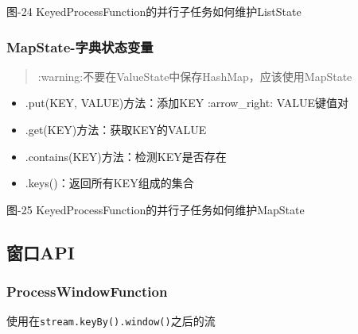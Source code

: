 图-24 KeyedProcessFunction的并行子任务如何维护ListState

\hypertarget{mapstate-ux5b57ux5178ux72b6ux6001ux53d8ux91cf}{%
\subsubsection{MapState-字典状态变量}\label{mapstate-ux5b57ux5178ux72b6ux6001ux53d8ux91cf}}

\begin{quote}
:warning:不要在ValueState中保存HashMap，应该使用MapState
\end{quote}

\begin{itemize}
\tightlist
\item
  .put(KEY, VALUE)方法：添加KEY :arrow\_right: VALUE键值对
\item
  .get(KEY)方法：获取KEY的VALUE
\item
  .contains(KEY)方法：检测KEY是否存在
\item
  .keys()：返回所有KEY组成的集合
\end{itemize}

图-25 KeyedProcessFunction的并行子任务如何维护MapState

\hypertarget{ux7a97ux53e3api}{%
\subsection{窗口API}\label{ux7a97ux53e3api}}

\hypertarget{processwindowfunction}{%
\subsubsection{ProcessWindowFunction}\label{processwindowfunction}}

使用在\texttt{stream.keyBy().window()}之后的流

